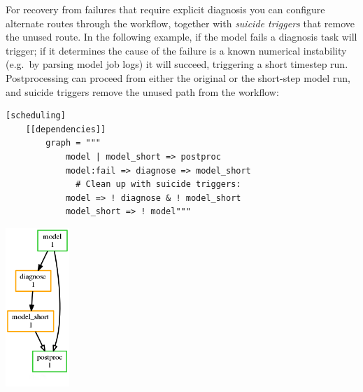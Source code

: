 For recovery from failures that require explicit diagnosis you can configure
alternate routes through the workflow, together with {\em suicide triggers}
that remove the unused route. In the following example, if the model fails a
diagnosis task will trigger; if it determines the cause of the failure is a
known numerical instability (e.g.\ by parsing model job logs) it will succeed,
triggering a short timestep run. Postprocessing can proceed from either the
original or the short-step model run, and suicide triggers remove the unused
path from the workflow:

\lstset{language=suiterc}
\begin{lstlisting}
[scheduling]
    [[dependencies]]
        graph = """
            model | model_short => postproc
            model:fail => diagnose => model_short
              # Clean up with suicide triggers:
            model => ! diagnose & ! model_short
            model_short => ! model"""
\end{lstlisting}
  \includegraphics[width=0.18\textwidth]{resources/png/failure-recovery.png}


